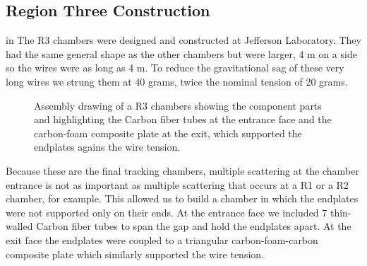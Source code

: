 
\subsection{Region Three Construction}

 in
The R3 chambers were designed and constructed at Jefferson Laboratory.  
They had the same general shape as the other chambers but were larger,
4 m on a side so the wires were as long as 4 m.
To reduce the gravitational sag of these very long wires we
strung them at 40 grams, twice the nominal tension of 20 grams.

\begin{figure}[htpb]
\vspace{7.9cm}
\caption{\small{Assembly drawing of a R3 chambers showing the component
parts and highlighting the Carbon fiber tubes at the entrance face and
the carbon-foam composite plate at the exit, which supported the endplates
agains the wire tension.}}
\label{r3_cut}
\end{figure}

Because these are the final tracking chambers, multiple scattering
at the chamber entrance is not as important as multiple scattering that
occurs at a R1 or a R2 chamber, for example.  This allowed us to 
build a chamber in which the endplates were not supported only on
their ends.  At the entrance face we included 7 thin-walled Carbon
fiber tubes to span the gap and hold the endplates apart.  At the
exit face the endplates were coupled to a triangular carbon-foam-carbon
composite plate which similarly supported the wire tension.




